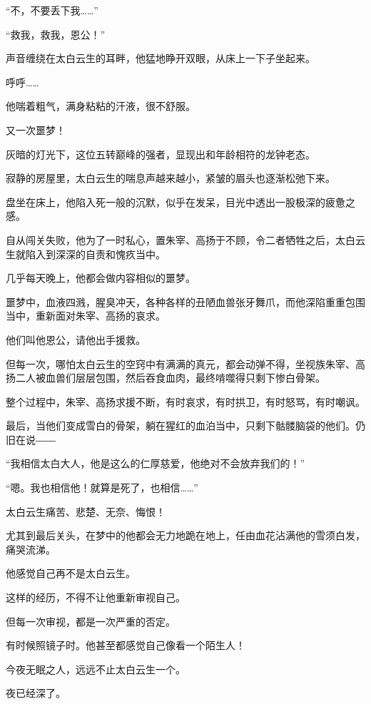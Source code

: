 
\begin{this_body}

“不，不要丢下我……”

“救我，救我，恩公！”

声音缠绕在太白云生的耳畔，他猛地睁开双眼，从床上一下子坐起来。

呼呼……

他喘着粗气，满身粘粘的汗液，很不舒服。

又一次噩梦！

灰暗的灯光下，这位五转巅峰的强者，显现出和年龄相符的龙钟老态。

寂静的房屋里，太白云生的喘息声越来越小，紧皱的眉头也逐渐松弛下来。

盘坐在床上，他陷入死一般的沉默，似乎在发呆，目光中透出一股极深的疲惫之感。

自从闯关失败，他为了一时私心，置朱宰、高扬于不顾，令二者牺牲之后，太白云生就陷入到深深的自责和愧疚当中。

几乎每天晚上，他都会做内容相似的噩梦。

噩梦中，血液四溅，腥臭冲天，各种各样的丑陋血兽张牙舞爪，而他深陷重重包围当中，重新面对朱宰、高扬的哀求。

他们叫他恩公，请他出手援救。

但每一次，哪怕太白云生的空窍中有满满的真元，都会动弹不得，坐视族朱宰、高扬二人被血兽们层层包围，然后吞食血肉，最终啃噬得只剩下惨白骨架。

整个过程中，朱宰、高扬求援不断，有时哀求，有时拱卫，有时怒骂，有时嘲讽。

最后，当他们变成雪白的骨架，躺在猩红的血泊当中，只剩下骷髅脑袋的他们。仍旧在说――

“我相信太白大人，他是这么的仁厚慈爱，他绝对不会放弃我们的！”

“嗯。我也相信他！就算是死了，也相信……”

太白云生痛苦、悲楚、无奈、悔恨！

尤其到最后关头，在梦中的他都会无力地跪在地上，任由血花沾满他的雪须白发，痛哭流涕。

他感觉自己再不是太白云生。

这样的经历，不得不让他重新审视自己。

但每一次审视，都是一次严重的否定。

有时候照镜子时。他甚至都感觉自己像看一个陌生人！

今夜无眠之人，远远不止太白云生一个。

夜已经深了。


\end{this_body}
